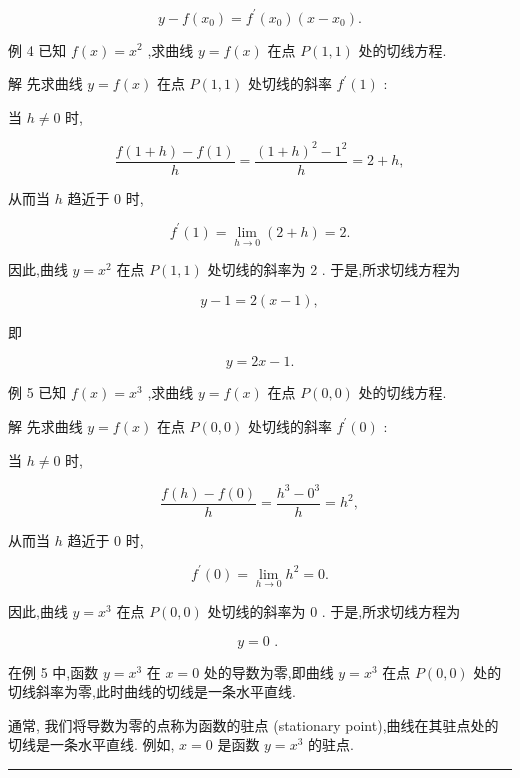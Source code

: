 \documentclass[10pt]{article}
\newcommand{\HRule}{\begin{center}\rule{0.9\linewidth}{0.2mm}\end{center}}
\begin{document}
\[
y - f\left( {x}_{0}\right)  = {f}^{\prime }\left( {x}_{0}\right) \left( {x - {x}_{0}}\right) .
\]

例 4 已知 \(f\left( x\right)  = {x}^{2}\) ,求曲线 \(y = f\left( x\right)\) 在点 \(P\left( {1,1}\right)\) 处的切线方程.

解 先求曲线 \(y = f\left( x\right)\) 在点 \(P\left( {1,1}\right)\) 处切线的斜率 \({f}^{\prime }\left( 1\right)\) :

当 \(h \neq  0\) 时,

\[
\frac{f\left( {1 + h}\right)  - f\left( 1\right) }{h} = \frac{{\left( 1 + h\right) }^{2} - {1}^{2}}{h} = 2 + h,
\]

从而当 \(h\) 趋近于 0 时,

\[
{f}^{\prime }\left( 1\right)  = \mathop{\lim }\limits_{{h \rightarrow  0}}\left( {2 + h}\right)  = 2.
\]

因此,曲线 \(y = {x}^{2}\) 在点 \(P\left( {1,1}\right)\) 处切线的斜率为 2 . 于是,所求切线方程为



\[
y - 1 = 2\left( {x - 1}\right) ,
\]

即

\[
y = {2x} - 1.
\]

例 5 已知 \(f\left( x\right)  = {x}^{3}\) ,求曲线 \(y = f\left( x\right)\) 在点 \(P\left( {0,0}\right)\) 处的切线方程.

解 先求曲线 \(y = f\left( x\right)\) 在点 \(P\left( {0,0}\right)\) 处切线的斜率 \({f}^{\prime }\left( 0\right)\) :

当 \(h \neq  0\) 时,

\[
\frac{f\left( h\right)  - f\left( 0\right) }{h} = \frac{{h}^{3} - {0}^{3}}{h} = {h}^{2},
\]

从而当 \(h\) 趋近于 0 时,

\[
{f}^{\prime }\left( 0\right)  = \mathop{\lim }\limits_{{h \rightarrow  0}}{h}^{2} = 0.
\]

因此,曲线 \(y = {x}^{3}\) 在点 \(P\left( {0,0}\right)\) 处切线的斜率为 0 . 于是,所求切线方程为

\[
y = 0\text{ . }
\]

在例 5 中,函数 \(y = {x}^{3}\) 在 \(x = 0\) 处的导数为零,即曲线 \(y = {x}^{3}\) 在点 \(P\left( {0,0}\right)\) 处的切线斜率为零,此时曲线的切线是一条水平直线.

通常, 我们将导数为零的点称为函数的驻点 (stationary point),曲线在其驻点处的切线是一条水平直线. 例如, \(x = 0\) 是函数 \(y = {x}^{3}\) 的驻点.

\HRule
\end{document}
